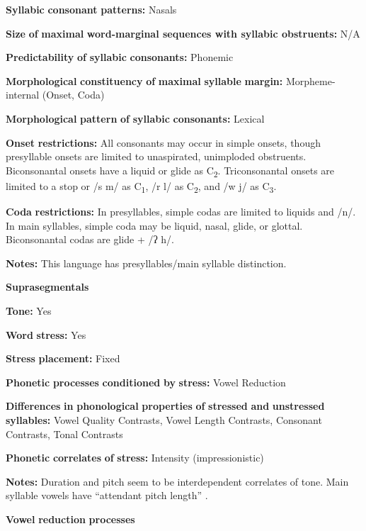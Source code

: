 \begin{styleBody}
\textbf{Syllabic} \textbf{consonant} \textbf{patterns:} Nasals

\textbf{Size} \textbf{of} \textbf{maximal} \textbf{word{}-marginal sequences with syllabic obstruents:} N/A

\textbf{Predictability} \textbf{of} \textbf{syllabic} \textbf{consonants:} Phonemic

\textbf{Morphological} \textbf{constituency} \textbf{of} \textbf{maximal} \textbf{syllable} \textbf{margin:} Morpheme-internal (Onset, Coda)

\textbf{Morphological} \textbf{pattern} \textbf{of} \textbf{syllabic} \textbf{consonants:} Lexical

\textbf{Onset} \textbf{restrictions:} All consonants may occur in simple onsets, though presyllable onsets are limited to unaspirated, unimploded obstruents. Biconsonantal onsets have a liquid or glide as C\textsubscript{2}. Triconsonantal onsets are limited to a stop or /s m/ as C\textsubscript{1}, /r l/ as C\textsubscript{2}, and /w j/ as C\textsubscript{3}.

\textbf{Coda} \textbf{restrictions:} In presyllables, simple codas are limited to liquids and /n/. In main syllables, simple coda may be liquid, nasal, glide, or glottal. Biconsonantal codas are glide + /ʔ h/.

\textbf{Notes:} This language has presyllables/main syllable distinction.

\textbf{Suprasegmentals}

\textbf{Tone:} Yes

\textbf{Word} \textbf{stress:} Yes

\textbf{Stress} \textbf{placement:} Fixed

\textbf{Phonetic} \textbf{processes} \textbf{conditioned} \textbf{by} \textbf{stress:} Vowel Reduction

\textbf{Differences} \textbf{in} \textbf{phonological} \textbf{properties} \textbf{of} \textbf{stressed} \textbf{and} \textbf{unstressed} \textbf{syllables:} Vowel Quality Contrasts, Vowel Length Contrasts, Consonant Contrasts, Tonal Contrasts

\textbf{Phonetic} \textbf{correlates} \textbf{of} \textbf{stress:} Intensity (impressionistic)

\textbf{Notes:} Duration and pitch seem to be interdependent correlates of tone. Main syllable vowels have “attendant pitch length” \citep[32]{Olsen2014}.

\textbf{Vowel} \textbf{reduction} \textbf{processes}


\end{styleBody}
